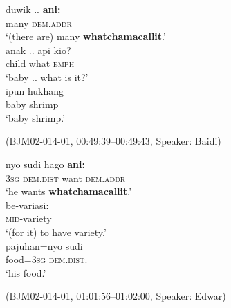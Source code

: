 \documentclass[output=paper,colorlinks,citecolor=brown
\ChapterDOI{10.5281/zenodo.15697585}
]{langscibook}
\begin{document}
\begin{exe}
    \ex\label{ex:indet-nom} \begin{xlist}[0\quad →A:]
         \gll
        duwik .. \textbf{ani:} \\
        many {} \textsc{dem.addr} \\
        \glt `(there are) many \textbf{whatchamacallit}.' \\
        \exi{2\quad \hphantom{→B:}} \gll
        anak .. api kio? \\
        child {} what \textsc{emph} \\
        \glt `baby .. what is it?' \\
        \exi{3\quad \hphantom{→B:}} \gll
        \uline{ipun hukhang} \\
        {baby shrimp} \\
        \glt `\uline{baby shrimp}.' \\
    \end{xlist}
    \hfill (BJM02-014-01, 00:49:39–00:49:43, Speaker: Baidi) 

    \ex\label{ex:indet-verb} \begin{xlist}[0\quad →A:]
         \gll
        nyo sudi hago \textbf{ani:} \\
        3\textsc{sg} \textsc{dem.dist} want \textsc{dem.addr} \\
        \glt `he wants \textbf{whatchamacallit}.' \\
        \exi{2\quad \hphantom{→J:}} \gll
        \uline{be-variasi:} \\
        \textsc{mid}-variety \\
        \glt `\uline{(for it) to have variety}.' \\
        \exi{3\quad \hphantom{→J:}} \gll
        pajuhan=nyo sudi \\
        food=3\textsc{sg} \textsc{dem.dist}. \\
        \glt `his food.' \\
    \end{xlist}
    \hfill (BJM02-014-01, 01:01:56–01:02:00, Speaker: Edwar) 
\end{exe}
\end{document}
